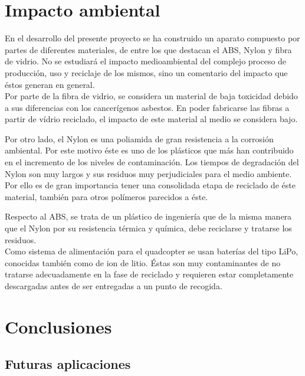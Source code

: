 \documentclass[twoside,11pt]{book}
\begin{document}
\chapter{Impacto ambiental} \label{impacto}

En el desarrollo del presente proyecto se ha construido un aparato  compuesto por partes de diferentes materiales, de entre los que destacan el ABS, Nylon y fibra de vidrio. No se estudiará el  impacto medioambiental del complejo proceso de producción, uso y reciclaje de los mismos, sino un comentario del impacto que éstos generan en general. \\

Por parte de la fibra de vidrio, se considera un material de baja toxicidad debido a sus diferencias con los cancerígenos asbestos. En poder fabricarse las fibras a partir de vídrio reciclado, el impacto de este material al medio se considera bajo.

Por otro lado, el Nylon es una poliamida de gran resistencia a la corrosión ambiental. Por este motivo éste es uno de los plásticos que más han contribuido en el incremento de los niveles de contaminación. Los tiempos de degradación del Nylon son muy largos y sus residuos muy perjudiciales para el medio ambiente. Por ello es de gran importancia tener una consolidada etapa de reciclado de éste material, también para otros polímeros parecidos a éste.

Respecto al ABS, se trata de un plástico de ingeniería que de la misma manera que el Nylon por su resistencia térmica y química, debe reciclarse y tratarse los residuos. \\

Como sistema de alimentación para el quadcopter se usan baterías del tipo LiPo, conocidas también como de ion de litio. Éstas son muy contaminantes de no tratarse adecuadamente en la fase de reciclado y requieren estar completamente descargadas antes de ser entregadas a un punto de recogida.

\newpage

\chapter{Conclusiones} \label{conclusiones}



\section{Futuras aplicaciones}
\end{document}
